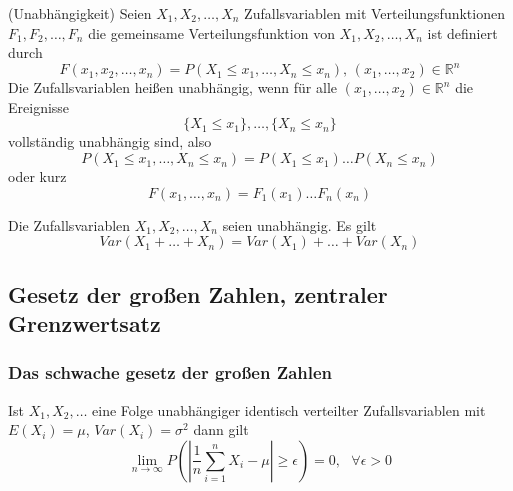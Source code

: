 \documentclass[
	ngerman,
	accentcolor=9c,%
	type=intern,
	marginpar=false
	]{tudapub}
\begin{document}
                \setcounter{satz}{2}
                \begin{definition}(Unabhängigkeit)
                    Seien $X_1,X_2,\dots,X_n$ Zufallsvariablen mit Verteilungsfunktionen $F_1,F_2,\dots,F_n$
                    die gemeinsame Verteilungsfunktion von $X_1,X_2,\dots,X_n$ ist definiert durch 
                    \begin{equation*}
                        F(x_1,x_2,\dots,x_n) = P(X_1 \leq x_1, \dots, X_n \leq x_n)\mbox{, }(x_1,\dots,x_2) \in \mathbb{R}^n
                    \end{equation*}
                    Die Zufallsvariablen heißen unabhängig, wenn für alle $(x_1,\dots,x_2) \in \mathbb{R}^n$ die Ereignisse
                    \begin{equation*}
                        \{X_1 \leq x_1\}, \dots, \{X_n \leq x_n\}
                    \end{equation*}
                    vollständig unabhängig sind, also
                    \begin{equation*}
                        P(X_1 \leq x_1, \dots, X_n \leq x_n) = P(X_1 \leq x_1)\dots P(X_n \leq x_n)
                    \end{equation*}
                    oder kurz
                    \begin{equation*}
                        F(x_1, \dots, x_n) = F_1(x_1)\dots F_n(x_n)
                    \end{equation*}
                \end{definition}
                \begin{satz}
                    Die Zufallsvariablen $X_1,X_2,\dots,X_n$ seien unabhängig. Es gilt
                    \begin{equation*}
                        Var(X_1+\dots+X_n) = Var(X_1) + \dots + Var(X_n)
                    \end{equation*}
                \end{satz}
                \newpage
        \subsection{Gesetz der großen Zahlen, zentraler Grenzwertsatz}
            \subsubsection{Das schwache gesetz der großen Zahlen}
                \begin{satz}
                    Ist $X_1,X_2,\dots$ eine Folge unabhängiger identisch verteilter Zufallsvariablen mit $E(X_i)=\mu$, $Var(X_i)=\sigma^2$ dann gilt
                    \begin{equation*}
                        \lim_{n\rightarrow \infty}P\left(
                            \left|\dfrac{1}{n}\sum_{i=1}^n X_i - \mu \right| \geq \epsilon
                        \right)
                        = 0,\mbox{ } \forall \epsilon > 0
                    \end{equation*}
                \end{satz}
\end{document}
